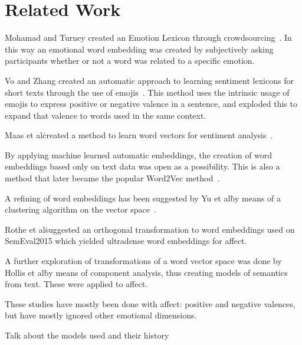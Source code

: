 \chapter{Related Work}\label{chap:Related Work}

Mohamad and Turney created an Emotion Lexicon through crowdsourcing~\cite{mohammad_crowdsourcing_2013}. In this way an emotional word embedding was created by subjectively asking participants whether or not a word was related to a specific emotion.

Vo and Zhang created an automatic approach to learning sentiment lexicons for short texts through the use of emojis~\cite{vo_dont_2016}. This method uses the intrinsic usage of emojis to express positive or negative valence in a sentence, and exploded this to expand that valence to words used in the same context.

Maas et al\. created a method to learn word vectors for sentiment analysis~\cite{maas_learning_2011}.

By applying machine learned automatic embeddings, the creation of word embeddings based only on text data was open as a possibility. This is also a method that later became the popular Word2Vec method~\cite{mikolov_distributed_2013}.

A refining of word embeddings has been suggested by Yu et al\. by means of a clustering algorithm on the vector space~\cite{yu_refining_2017}.

Rothe et al\. suggested an orthogonal transformation to word embeddings used on SemEval2015 which yielded ultradense word embeddings for affect\cite{rothe_ultradense_2016}.

A further exploration of transformations of a word vector space was done by Hollis et al\. by means of component analysis, thus creating models of semantics from text. These were applied to affect\cite{hollis_principals_2016}.

These studies have mostly been done with affect: positive and negative valences, but have mostly ignored other emotional dimensions.


Talk about the models used and their history


